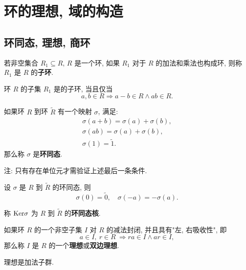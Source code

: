 \chapter{环的理想, 域的构造}


\section{环同态, 理想, 商环}

\begin{definition}\label{子环}
	若非空集合 $R_1\subseteq R$, $R$ 是一个环, 如果 $R_1$ 对于 $R$ 的加法和乘法也构成环, 则称 $R_1$ 是 $R$ 的\textbf{子环}.
\end{definition}

\begin{proposition}
	环 $R$ 的子集 $R_1$ 是的子环, 当且仅当 $$a,b\in R\Rightarrow a-b\in R\wedge ab\in R.$$
\end{proposition}

\begin{definition}\label{环同态}
	如果环 $R$ 到环 $\widetilde{R}$ 有一个映射 $\sigma$, 满足:
	$$
	\begin{array}{l}
		\sigma(a+b)=\sigma(a)+\sigma(b), \\
		\sigma(ab)=\sigma(a)+\sigma(b), \\
		\sigma(1)=\widetilde{1}.
	\end{array}
	$$
	那么称 $\sigma$ 是\textbf{环同态}.
\end{definition}

注: 只有存在单位元才需验证上述最后一条条件.

\begin{property}
	设 $\sigma$ 是 $R$ 到 $\widetilde{R}$ 的环同态, 则
	$$\sigma(0)=\widetilde{0},\quad\sigma(-a)=-\sigma(a).$$
\end{property}

\begin{definition}
	称 $\text {Ker} \sigma$ 为 $R$ 到 $\widetilde{R}$ 的\textbf{环同态核}.
\end{definition}

\begin{definition}\label{理想}
	如果环 $R$ 的一个非空子集 $I$ 对 $R$ 的减法封闭, 并且具有"左, 右吸收性", 即 $$a\in I,\ r\in R\ \Rightarrow ra \in I\wedge ar\in I,$$ 那么称 $I$ 是 $R$ 的一个\textbf{理想}或\textbf{双边理想}.
\end{definition}

\begin{corollary}
	理想是加法子群.
\end{corollary}


